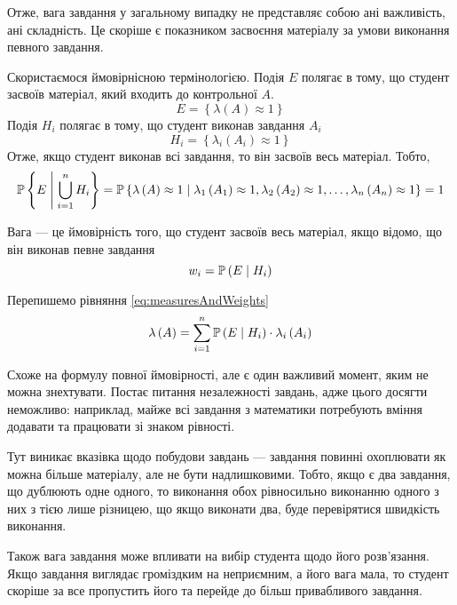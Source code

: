Отже, вага завдання у загальному випадку не представляє собою ані важливість,
ані складність.
Це скоріше є показником засвоєння матеріалу за умови виконання певного завдання.

Скористаємося ймовірнісною термінологією.
Подія $E$ полягає в тому, що студент засвоїв матеріал, який входить до
контрольної $A$.
\begin{equation*}
  E = \left\{ \lambda\left( A \right) \approx 1 \right\}
\end{equation*}
Подія $H_i$ полягає в тому, що студент виконав завдання $A_i$
\begin{equation*}
  H_i = \left\{ \lambda_i\left( A_i \right) \approx 1 \right\}
\end{equation*}
Отже, якщо студент виконав всі завдання, то він засвоїв весь
матеріал.
Тобто,
\begin{equation*}
  \mathbb{P}\left\{ E \;\middle|\; \bigcup_{i=1}^n H_i \right\}
  = \mathbb{P}\left\{ \lambda\left( A \right) \approx 1 \;\middle|\;
    \lambda_1\left( A_1 \right) \approx 1,
    \lambda_2\left( A_2 \right) \approx 1,
    \dots,
    \lambda_n\left( A_n \right) \approx 1 \right\}
  = 1
\end{equation*}

Вага --- це ймовірність того, що студент засвоїв весь матеріал, якщо відомо, що
він виконав певне завдання
\begin{equation*}
  w_i = \mathbb{P}\left( E \;\middle|\; H_i \right)
\end{equation*}

Перепишемо рівняння \eqref{eq:measuresAndWeights}
\begin{equation*}
  \lambda\left( A \right)
  = \sum_{i=1}^{n} \mathbb{P}\left( E \;\middle|\; H_i \right) \cdot \lambda_i\left( A_i \right)
\end{equation*}

Схоже на формулу повної ймовірності, але є один важливий момент, яким не можна
знехтувати.
Постає питання незалежності завдань, адже цього досягти неможливо:
наприклад, майже всі завдання з математики потребують вміння додавати та
працювати зі знаком рівності.

Тут виникає вказівка щодо побудови завдань --- завдання повинні охоплювати
як можна більше матеріалу, але не бути надлишковими.
Тобто, якщо є два завдання, що дублюють одне одного, то виконання обох
рівносильно виконанню одного з них з тією лише різницею, що якщо виконати два,
буде перевірятися швидкість виконання.

Також вага завдання може впливати на вибір студента щодо його розв’язання.
Якщо завдання виглядає громіздким на неприємним, а його вага мала, то студент
скоріше за все пропустить його та перейде до більш привабливого завдання.

